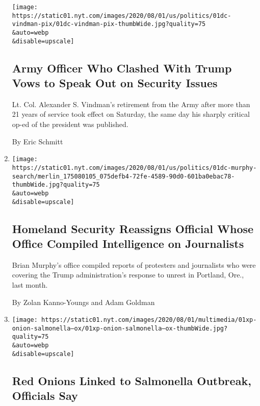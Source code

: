 \begin{enumerate}
  \texttt{[image: https://static01.nyt.com/images/2020/08/01/us/politics/01dc-vindman-pix/01dc-vindman-pix-thumbWide.jpg?quality=75\\\&auto=webp\\\&disable=upscale]}

  \hypertarget{army-officer-who-clashed-with-trump-vows-to-speak-out-on-security-issues}{%
  \subsection{Army Officer Who Clashed With Trump Vows to Speak Out on
  Security
  Issues}\label{army-officer-who-clashed-with-trump-vows-to-speak-out-on-security-issues}}

  Lt. Col. Alexander S. Vindman's retirement from the Army after more
  than 21 years of service took effect on Saturday, the same day his
  sharply critical op-ed of the president was published.

  By Eric Schmitt
\item
  \href{/2020/08/01/us/politics/brian-murphy-homeland-security-protesters.html}{}

  \texttt{[image: https://static01.nyt.com/images/2020/08/01/us/politics/01dc-murphy-search/merlin\_175080105\_075defb4-72fe-4589-90d0-601ba0ebac78-thumbWide.jpg?quality=75\\\&auto=webp\\\&disable=upscale]}

  \hypertarget{homeland-security-reassigns-official-whose-office-compiled-intelligence-on-journalists}{%
  \subsection{Homeland Security Reassigns Official Whose Office Compiled
  Intelligence on
  Journalists}\label{homeland-security-reassigns-official-whose-office-compiled-intelligence-on-journalists}}

  Brian Murphy's office compiled reports of protesters and journalists
  who were covering the Trump administration's response to unrest in
  Portland, Ore., last month.

  By Zolan Kanno-Youngs and Adam Goldman
\item
  \href{/2020/08/01/us/salmonella-outbreak-onions.html}{}

  \texttt{[image: https://static01.nyt.com/images/2020/08/01/multimedia/01xp-onion-salmonella--ox/01xp-onion-salmonella--ox-thumbWide.jpg?quality=75\\\&auto=webp\\\&disable=upscale]}

  \hypertarget{red-onions-linked-to-salmonella-outbreak-officials-say}{%
  \subsection{Red Onions Linked to Salmonella Outbreak, Officials
  Say}\label{red-onions-linked-to-salmonella-outbreak-officials-say}}


\end{enumerate}
